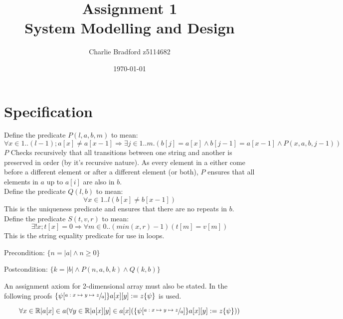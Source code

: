 \documentclass[a4paper]{article}
\title{%
		\huge Assignment 1 \\
\large System Modelling and Design}
\author{Charlie Bradford z5114682}
\date{\today}
\begin{document}
\vspace{2 in}
\maketitle



\section{Specification}

Define the predicate $P(l, a, b, m)$ to mean:
$$ \forall x \in 1..(l-1); a[x] \neq a[x-1] \Rightarrow \exists j \in 1..m.(b[j] = a[x] \land b[j-1] = a[x-1] \land  P(x, a, b, j-1)) $$
$P$ Checks recursively that all transitions between one string and another is preserved in order (by it's recursive nature). As every element in a either come before a different element or after a different element (or both), $P$ ensures that all elements in $a$ up to $a[i]$ are also in $b$.
 \\
Define the predicate $Q(l, b)$ to mean:
$$ \forall x \in 1..l(b[x] \neq b[x-1])$$
This is the uniqueness predicate and ensures that there are no repeats in $b$.
\\
Define the predicate $S(t, v, r)$ to mean:
$$ \exists! x;t[x] = 0 \Rightarrow \forall m \in 0..(min(x, r) - 1)(t[m] = v[m]) $$
This is the string equality predicate for use in loops.

\begin{description}
		\item{Precondition:} $\{ n=|a| \land n \geq 0 \} $
		\item{Postcondition:} $\{ k = |b| \land P(n, a, b, k) \land Q(k, b) \}$
\end{description}

An assignment axiom for 2-dimensional array must also be stated. In the following proofs $\{\psi[\sfrac{a: x \mapsto y \mapsto z}{a}]\}a[x][y] := z \{\psi\}$ is used. 

$$ \forall x \in \mathbb{R} | a[x] \in a(\forall y \in \mathbb{R} | a[x][y] \in a[x](\{\psi[\sfrac{a: x \mapsto y \mapsto z}{a}]\}a[x][y] := z \{\psi\})) $$
\end{document}
